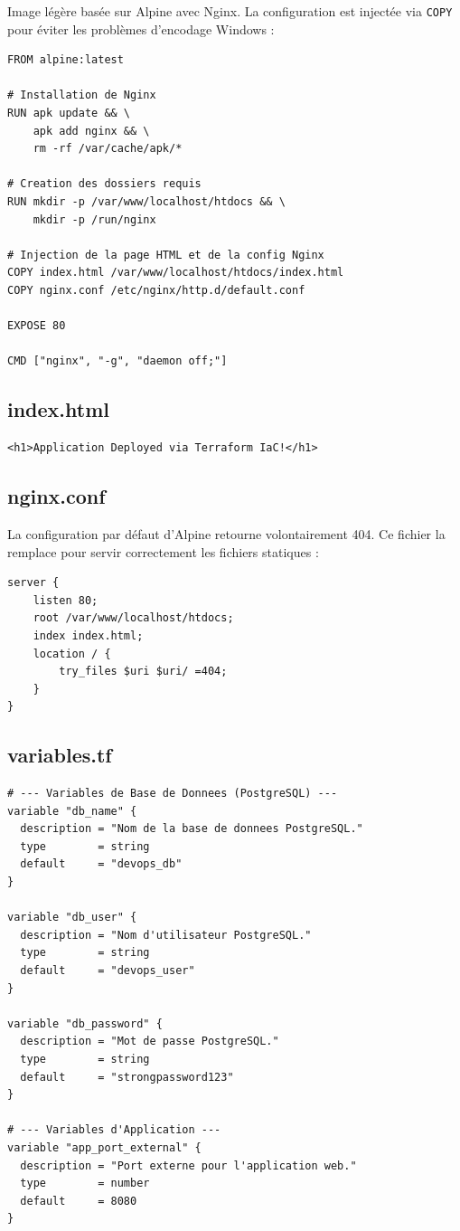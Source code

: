 \documentclass[12pt,a4paper]{article}
\begin{document}
Image légère basée sur Alpine avec Nginx. La configuration est injectée via
\texttt{COPY} pour éviter les problèmes d'encodage Windows :

\begin{lstlisting}[style=dockerStyle, caption=Dockerfile\_app]
FROM alpine:latest

# Installation de Nginx
RUN apk update && \
    apk add nginx && \
    rm -rf /var/cache/apk/*

# Creation des dossiers requis
RUN mkdir -p /var/www/localhost/htdocs && \
    mkdir -p /run/nginx

# Injection de la page HTML et de la config Nginx
COPY index.html /var/www/localhost/htdocs/index.html
COPY nginx.conf /etc/nginx/http.d/default.conf

EXPOSE 80

CMD ["nginx", "-g", "daemon off;"]
\end{lstlisting}

\subsection{index.html}

\begin{lstlisting}[style=dockerStyle, caption=index.html]
<h1>Application Deployed via Terraform IaC!</h1>
\end{lstlisting}

\subsection{nginx.conf}

La configuration par défaut d'Alpine retourne volontairement 404. Ce fichier
la remplace pour servir correctement les fichiers statiques :

\begin{lstlisting}[style=dockerStyle, caption=nginx.conf]
server {
    listen 80;
    root /var/www/localhost/htdocs;
    index index.html;
    location / {
        try_files $uri $uri/ =404;
    }
}
\end{lstlisting}

\subsection{variables.tf}

\begin{lstlisting}[style=hclStyle, caption=variables.tf]
# --- Variables de Base de Donnees (PostgreSQL) ---
variable "db_name" {
  description = "Nom de la base de donnees PostgreSQL."
  type        = string
  default     = "devops_db"
}

variable "db_user" {
  description = "Nom d'utilisateur PostgreSQL."
  type        = string
  default     = "devops_user"
}

variable "db_password" {
  description = "Mot de passe PostgreSQL."
  type        = string
  default     = "strongpassword123"
}

# --- Variables d'Application ---
variable "app_port_external" {
  description = "Port externe pour l'application web."
  type        = number
  default     = 8080
}
\end{lstlisting}
\end{document}
